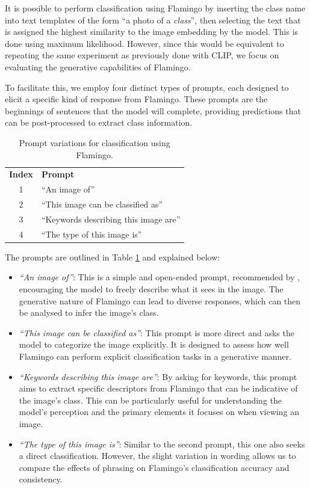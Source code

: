 It is possible to perform classification using Flamingo by inserting the class name into text templates of the form “a photo of a \textit{class}”, then selecting the text that is assigned the highest similarity to the image embedding by the model. This is done using maximum likelihood. However, since this would be equivalent to repeating the same experiment as previously done with CLIP, we focus on evaluating the generative capabilities of Flamingo.

To facilitate this, we employ four distinct types of prompts, each designed to elicit a specific kind of response from Flamingo. These prompts are the beginnings of sentences that the model will complete, providing predictions that can be post-processed to extract class information. 

\begin{table}[ht]
    \centering
    \begin{tabular}{cl}
        \rowcolor{lightgreen} \textbf{Index} & \textbf{Prompt} \\
        \rowcolor{lightgreen} 1 & “An image of” \\
        \rowcolor{lightgreen} 2 & “This image can be classified as” \\
        \rowcolor{lightgreen} 3 & “Keywords describing this image are” \\
        \rowcolor{lightgreen} 4 & “The type of this image is” \\
    \end{tabular}
    \caption{Prompt variations for classification using Flamingo.}
    \label{tab:flam-prompts}
\end{table}

The prompts are outlined in Table \ref{tab:flam-prompts} and explained below:
\begin{itemize}
    \item \textit{“An image of”}: This is a simple and open-ended prompt, recommended by \parencite{alayrac2022flamingo}, encouraging the model to freely describe what it sees in the image. The generative nature of Flamingo can lead to diverse responses, which can then be analysed to infer the image's class.
    \item \textit{“This image can be classified as”}: This prompt is more direct and asks the model to categorize the image explicitly. It is designed to assess how well Flamingo can perform explicit classification tasks in a generative manner.
    \item \textit{“Keywords describing this image are”}: By asking for keywords, this prompt aims to extract specific descriptors from Flamingo that can be indicative of the image's class. This can be particularly useful for understanding the model's perception and the primary elements it focuses on when viewing an image.
    \item \textit{“The type of this image is”}: Similar to the second prompt, this one also seeks a direct classification. However, the slight variation in wording allows us to compare the effects of phrasing on Flamingo's classification accuracy and consistency.
\end{itemize}


